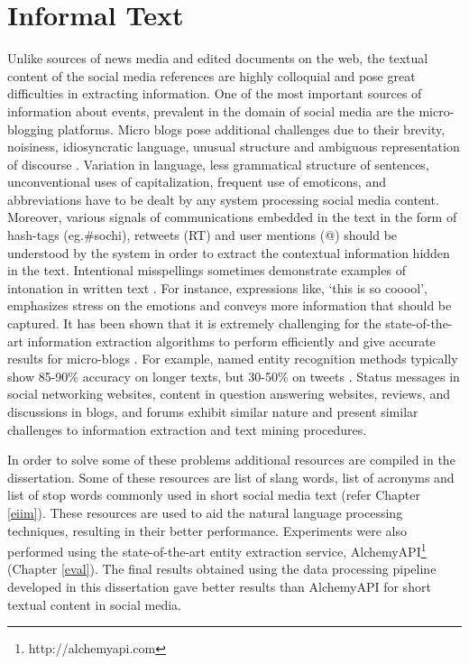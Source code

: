 \section{Informal Text}
Unlike sources of news media and edited documents on the web, the textual content of the social media references are highly colloquial and pose great difficulties in extracting information. One of the most important sources of information about events, prevalent in the domain of social media are the micro-blogging platforms. Micro blogs pose additional challenges due to their brevity, noisiness, idiosyncratic language, unusual structure and ambiguous representation of discourse \cite{bontcheva2013twitie}. Variation in language, less grammatical structure of sentences, unconventional uses of capitalization, frequent use of emoticons, and abbreviations have to be dealt by any system processing social media content. Moreover, various signals of communications embedded in the text in the form of hash-tags (eg.\#sochi), retweets (RT) and user mentions (@) should be understood by the system in order to extract the contextual information hidden in the text. Intentional misspellings sometimes demonstrate examples of intonation in written text \cite{prevost1996information}. For instance, expressions like, `this is so cooool', emphasizes stress on the emotions and conveys more information that should be captured. It has been shown that it is extremely challenging for the state-of-the-art information extraction algorithms to perform efficiently and give accurate results for micro-blogs \cite{derczynski2013microblog}. For example, named entity recognition methods typically show 85-90\% accuracy on longer texts, but 30-50\% on tweets \cite{ritter2011named}. Status messages in social networking websites, content in question answering websites, reviews, and discussions in blogs, and forums exhibit similar nature and present similar challenges to information extraction and text mining procedures.

In order to solve some of these problems additional resources are compiled in the dissertation. Some of these resources are list of slang words, list of acronyms and list of stop words commonly used in short social media text (refer Chapter \ref{eiim}). These resources are used to aid the natural language processing techniques, resulting in their better performance. Experiments were also performed using the state-of-the-art entity extraction service, AlchemyAPI\footnote{http://alchemyapi.com} (Chapter \ref{eval}). The final results obtained using the data processing pipeline developed in this dissertation gave better results than AlchemyAPI for short textual content in social media.



